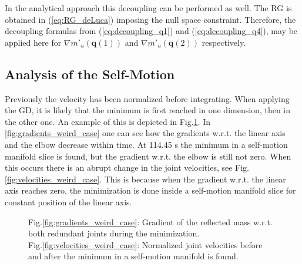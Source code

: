 In the analytical approach this decoupling can be performed as well. The RG is obtained in (\ref{eq:RG_deLuca}) imposing the null space constraint. Therefore, the decoupling formulas from (\ref{eq:decoupling_q1}) and (\ref{eq:decoupling_q4}), may be applied here for $\nabla m'_u(\mathbf{q}(1))$ and  $\nabla m'_u(\mathbf{q}(2))$ respectively.



\subsection{Analysis of the Self-Motion}





Previously the velocity has been normalized before integrating. When applying the GD, it is likely that the minimum is first reached in one dimension, then in the other one. An example of this is depicted in Fig.\ref{fig:weird case}. In \ref{fig:gradients_weird_case} one can see how the gradients w.r.t. the linear axis %
and the elbow %
decrease within time. At 114.45 s the minimum in a self-motion manifold slice is found, but the gradient w.r.t. the elbow is still not zero. When this occurs there is an abrupt change in the joint velocities, see Fig.\ref{fig:velocities_weird_case}.
This is because when the gradient w.r.t. the linear axis %
reaches zero, the minimization is done inside a self-motion manifold slice for constant position of the linear axis.

\begin{figure}[!htb]
	\centering	
	 	 	 	
	\caption{Fig.\ref{fig:gradients_weird_case}: Gradient of the reflected mass w.r.t. both redundant joints during the minimization. \\ Fig.\ref{fig:velocities_weird_case}: Normalized joint velocities before and after the minimum in a self-motion manifold is found. }
	\label{fig:weird case}
\end{figure} 






